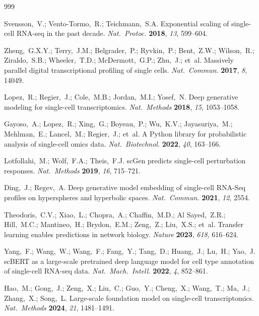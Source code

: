 

\begin{thebibliography}{999}
\setlength{\itemsep}{0pt}\setlength{\parskip}{0pt}\setlength{\parsep}{0pt}

Svensson,~V.; Vento-Tormo,~R.; Teichmann,~S.A. Exponential scaling of single-cell RNA-seq in the past decade. {\em Nat.\ Protoc.} {\bf 2018}, {\em 13}, 599--604.

Zheng,~G.X.Y.; Terry,~J.M.; Belgrader,~P.; Ryvkin,~P.; Bent,~Z.W.; Wilson,~R.; Ziraldo,~S.B.; Wheeler,~T.D.; McDermott,~G.P.; Zhu,~J.; et~al. Massively parallel digital transcriptional profiling of single cells. {\em Nat.\ Commun.} {\bf 2017}, {\em 8}, 14049.

Lopez,~R.; Regier,~J.; Cole,~M.B.; Jordan,~M.I.; Yosef,~N. Deep generative modeling for single-cell transcriptomics. {\em Nat.\ Methods} {\bf 2018}, {\em 15}, 1053--1058.

Gayoso,~A.; Lopez,~R.; Xing,~G.; Boyeau,~P.; Wu,~K.V.; Jayasuriya,~M.; Mehlman,~E.; Lancel,~M.; Regier,~J.; et~al. A Python library for probabilistic analysis of single-cell omics data. {\em Nat.\ Biotechnol.} {\bf 2022}, {\em 40}, 163--166.

Lotfollahi,~M.; Wolf,~F.A.; Theis,~F.J. scGen predicts single-cell perturbation responses. {\em Nat.\ Methods} {\bf 2019}, {\em 16}, 715--721.

Ding,~J.; Regev,~A. Deep generative model embedding of single-cell RNA-Seq profiles on hyperspheres and hyperbolic spaces. {\em Nat.\ Commun.} {\bf 2021}, {\em 12}, 2554.

Theodoris,~C.V.; Xiao,~L.; Chopra,~A.; Chaffin,~M.D.; Al Sayed,~Z.R.; Hill,~M.C.; Mantineo,~H.; Brydon,~E.M.; Zeng,~Z.; Liu,~X.S.; et~al. Transfer learning enables predictions in network biology. {\em Nature} {\bf 2023}, {\em 618}, 616--624.

Yang,~F.; Wang,~W.; Wang,~F.; Fang,~Y.; Tang,~D.; Huang,~J.; Lu,~H.; Yao,~J. scBERT as a large-scale pretrained deep language model for cell type annotation of single-cell RNA-seq data. {\em Nat.\ Mach.\ Intell.} {\bf 2022}, {\em 4}, 852--861.

Hao,~M.; Gong,~J.; Zeng,~X.; Liu,~C.; Guo,~Y.; Cheng,~X.; Wang,~T.; Ma,~J.; Zhang,~X.; Song,~L. Large-scale foundation model on single-cell transcriptomics. {\em Nat.\ Methods} {\bf 2024}, {\em 21}, 1481--1491.


\end{thebibliography}
